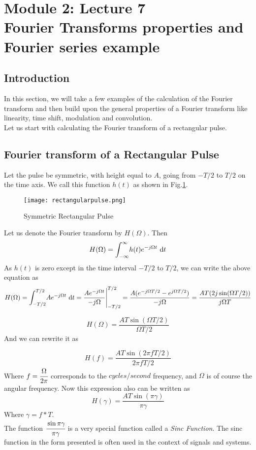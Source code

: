 \section{Module 2: Lecture 7\\Fourier Transforms properties and Fourier series example}

\subsection{Introduction}
	In this section, we will take a few examples of the calculation of the Fourier transform and then build upon the general properties of a Fourier transform like linearity, time shift, modulation and convolution. \\
	Let us start with calculating the Fourier transform of a rectangular pulse.
\subsection{Fourier transform of a Rectangular Pulse}
	Let the pulse be symmetric, with height equal to $A$, going from $-T/2$ to $T/2$ on the time axis. We call this function $h(t)$ as shown in Fig.\ref{fig:rectangular_pulse}.
	\begin{figure}[htp]
		\centering
		\texttt{[image: rectangularpulse.png]}
		\caption{Symmetric Rectangular Pulse}
		\label{fig:rectangular_pulse}
	\end{figure}
	Let us denote the Fourier transform by $ H(\Omega)$. Then
	\begin{equation}
		H(\Omega)=\int_{-\infty}^{\infty} \! {h(t) e^{-j\Omega t}} \ \mathrm{d} t
	\end{equation}
	As $h(t)$ is zero except in the time interval $-T/2$ to $T/2$, we can write the above equation as
	\begin{equation}
		H(\Omega)=\int_{-T/2}^{T/2} \! {A e^{-j\Omega t}} \ \mathrm{d} t =
		\frac{A e^{-j\Omega t}}{-j \Omega} \Bigg|_{-T/2}^{T/2}=
		\frac{A(e^{-j\Omega T/2}-e^{j\Omega T/2})}{-j\Omega}
		=\frac{AT (2j\sin({\Omega T/2}))}{j\Omega T}
	\end{equation}

	\begin{equation}
		H(\Omega)=\frac{AT\sin({\Omega T/2})}{\Omega T/2}
	\end{equation}
	And we can rewrite it as

	\begin{equation}
		H(f)=\frac{AT \sin({2\pi f T/2})}{2\pi f T/2}
	\end{equation}
	Where $f = \cfrac{\Omega}{2\pi}$ corresponds to the ${cycles}/{second}$ frequency, and $\Omega$ is of course the angular frequency.
	Now this expression also can be written as
	\begin{equation}
		H(\gamma)=\frac{AT \sin({\pi \gamma})}{\pi \gamma}
	\end{equation}
	Where $\gamma = f*T $.\\
	The function $\cfrac{\sin{\pi \gamma}}{\pi \gamma}$ is a very special function called a \emph{Sinc Function}. The sinc function in the form presented is often used in the context of signals and systems.

